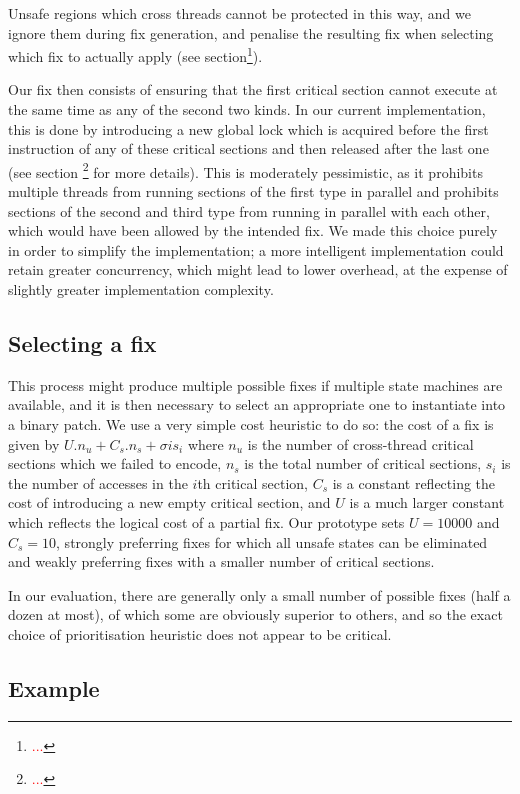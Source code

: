 \documentclass[10pt,twocolumn,preprint,natbib,authoryear]{sigplanconf}
\newcommand{\editorial}[1]{\textcolor{red}{\footnote{\textcolor{red}{#1}}}}
\begin{document}
Unsafe regions which cross threads cannot be protected in this way,
and we ignore them during fix generation, and penalise the resulting
fix when selecting which fix to actually apply (see
section\editorial{...}).

Our fix then consists of ensuring that the first critical section
cannot execute at the same time as any of the second two kinds.  In
our current implementation, this is done by introducing a new global
lock which is acquired before the first instruction of any of these
critical sections and then released after the last one (see section
\editorial{...} for more details).  This is moderately pessimistic, as
it prohibits multiple threads from running sections of the first type
in parallel and prohibits sections of the second and third type from
running in parallel with each other, which would have been allowed by
the intended fix.  We made this choice purely in order to simplify the
implementation; a more intelligent implementation could retain greater
concurrency, which might lead to lower overhead, at the expense of
slightly greater implementation complexity.

\subsection{Selecting a fix}

This process might produce multiple possible fixes if multiple state
machines are available, and it is then necessary to select an
appropriate one to instantiate into a binary patch.  We use a very
simple cost heuristic to do so: the cost of a fix is given by $U.n_u +
C_s.n_s + {\sigma{}{i}}s_i$ where $n_u$ is the number of cross-thread
critical sections which we failed to encode, $n_s$ is the total number
of critical sections, $s_i$ is the number of accesses in the $i$th
critical section, $C_s$ is a constant reflecting the cost of
introducing a new empty critical section, and $U$ is a much larger
constant which reflects the logical cost of a partial fix.  Our
prototype sets $U=10000$ and $C_s=10$, strongly preferring fixes for
which all unsafe states can be eliminated and weakly preferring fixes
with a smaller number of critical sections.

In our evaluation, there are generally only a small number of possible
fixes (half a dozen at most), of which some are obviously superior to
others, and so the exact choice of prioritisation heuristic does not
appear to be critical.

\subsection{Example}
\end{document}
